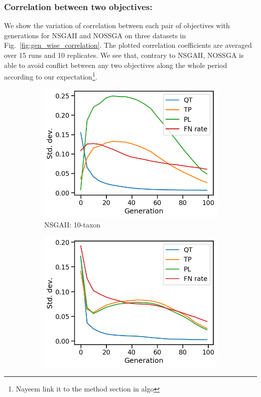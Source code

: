 \subsubsection{Correlation between two objectives:} We show the variation of correlation between each pair of objectives with generations for NSGAII and NOSSGA on three datasets in Fig.~\ref{fig:gen_wise_correlation}. The plotted correlation coefficients are averaged over 15 runs and 10 replicates. We see that, contrary to NSGAII, NOSSGA is able to avoid conflict between any two objectives along the whole period according to our expectation\footnote{Nayeem link it to the method section in algo}. 

\begin{figure}[!htbp]
	\centering
	\begin{adjustwidth}{-1cm}{-1cm}
		\begin{subfigure}[b]{0.4\textwidth}
			\includegraphics[width=\textwidth]{Figure/10-taxon_NSGAII_std_dev}
			\caption{NSGAII: 10-taxon}
		\end{subfigure}%
		\begin{subfigure}[b]{0.4\textwidth}
			\includegraphics[width=\textwidth]{Figure/11-taxon_NSGAII_std_dev}

\end{subfigure}
\end{adjustwidth}
\end{figure}
